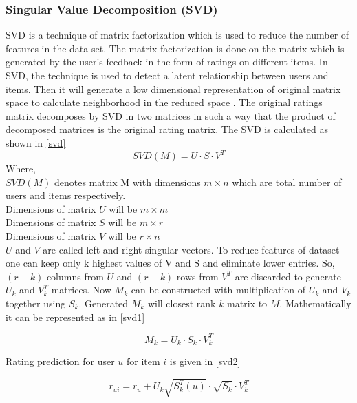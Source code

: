 \subsubsection{Singular Value Decomposition (SVD)}
\label{sec:svd}
SVD is a technique of matrix factorization which is used to reduce the number of features in the data set. The matrix factorization is done on the matrix which is generated by the user's feedback in the form of ratings on different items. In SVD, the technique is used to detect a latent relationship between users and items. Then it will generate a low dimensional representation of original matrix space to calculate neighborhood in the reduced space \cite{32}. The original ratings matrix decomposes by SVD in two matrices in such a way that the product of decomposed matrices is the original rating matrix. The SVD is calculated as shown in \autoref{svd}
\begin{equation}
SVD(M) = U \cdot S \cdot V^{T}
\label{svd}
\end{equation}
\noindent Where,\\
$SVD(M)$ denotes matrix M with dimensions $m \times n$ which are total number of users and items respectively.\\
Dimensions of matrix $U$ will be $m \times m$ \\
Dimensions of matrix $S$ will be $m \times r$ \\
Dimensions of matrix $V$ will be $r \times n$ \\
$U$ and $V$ are called left and right singular vectors. To reduce features of dataset one can keep only k highest values of V and S and eliminate lower entries. So, $(r-k)$ columns from $U$ and $(r-k)$ rows from $V^{T}$ are discarded to generate $U_{k}$ and $V_{k}^{T}$ matrices. Now $M_{k}$ can be constructed with multiplication of $U_{k}$ and $V_{k}$ together using $S_{k}$. Generated $M_{k}$ will closest rank $k$ matrix to $M$. Mathematically it can be represented as in \autoref{svd1}

\begin{equation}
M_{k} = U_{k} \cdot S_{k} \cdot V_{k}^{T}
\label{svd1}
\end{equation}

\noindent Rating prediction for user $u$ for item $i$ is given in \autoref{svd2}

\begin{equation}
r_{ui} = r_{u} + U_{k} \sqrt{S_{k}^{T} (u)} \cdot \sqrt{S_k} \cdot V_{k}^{T}
\label{svd2}
\end{equation}

